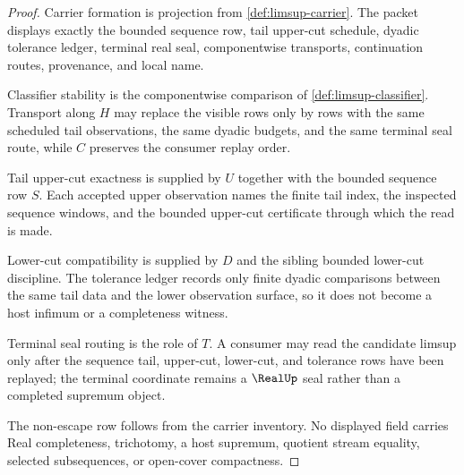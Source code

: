 \begin{proof}
Carrier formation is projection from \autoref{def:limsup-carrier}. The packet displays exactly the bounded sequence row, tail upper-cut schedule, dyadic tolerance ledger, terminal real seal, componentwise transports, continuation routes, provenance, and local name.

Classifier stability is the componentwise comparison of \autoref{def:limsup-classifier}. Transport along $H$ may replace the visible rows only by rows with the same scheduled tail observations, the same dyadic budgets, and the same terminal seal route, while $C$ preserves the consumer replay order.

Tail upper-cut exactness is supplied by $U$ together with the bounded sequence row $S$. Each accepted upper observation names the finite tail index, the inspected sequence windows, and the bounded upper-cut certificate through which the read is made.

Lower-cut compatibility is supplied by $D$ and the sibling bounded lower-cut discipline. The tolerance ledger records only finite dyadic comparisons between the same tail data and the lower observation surface, so it does not become a host infimum or a completeness witness.

Terminal seal routing is the role of $T$. A consumer may read the candidate limsup only after the sequence tail, upper-cut, lower-cut, and tolerance rows have been replayed; the terminal coordinate remains a $\RealUp$ seal rather than a completed supremum object.

The non-escape row follows from the carrier inventory. No displayed field carries Real completeness, trichotomy, a host supremum, quotient stream equality, selected subsequences, or open-cover compactness.
\end{proof}

